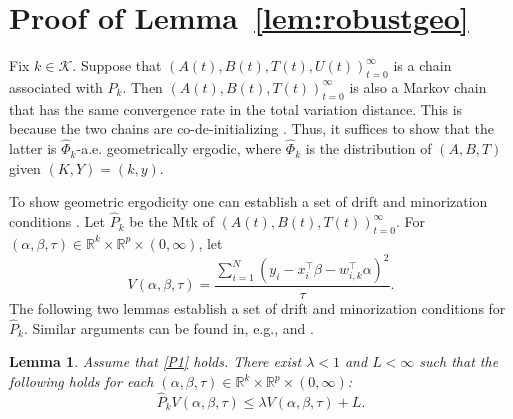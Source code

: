 \documentclass[12pt]{article}
\newtheorem{lemma}[theorem]{Lemma}
\begin{document}


\section{Proof of Lemma~\ref{lem:robustgeo}} \label{app:robustgeo}

Fix $k \in \mathcal{K}$.
Suppose that $(A(t), B(t), T(t), U(t))_{t=0}^{\infty}$ is a chain associated with $P_k$.
Then $(A(t), B(t), T(t))_{t=0}^{\infty}$ is also a Markov chain that has the same convergence rate in the total variation distance.
This is because the two chains are co-de-initializing \citep{roberts2001markov}.
Thus, it suffices to show that the latter is $\hat{\Phi}_k$-a.e. geometrically ergodic, where $\hat{\Phi}_k$ is the distribution of $(A,B,T)$ given $(K,Y) = (k,y)$.


To show geometric ergodicity one can establish a set of drift and minorization conditions \citep{rosenthal1995minorization}.
Let $\hat{P}_k$ be the Mtk of $(A(t), B(t), T(t))_{t=0}^{\infty}$.
For $(\alpha, \beta, \tau) \in \mathbb{R}^k \times \mathbb{R}^p \times (0,\infty)$, let
\[
V(\alpha, \beta, \tau) = \frac{\sum_{i=1}^N (y_i - x_i^{\top} \beta - w_{i,k}^{\top} \alpha)^2}{\tau}.
\]
The following two lemmas establish a set of drift and minorization conditions for $\hat{P}_k$.
Similar arguments can be found in, e.g., \cite{roy2010monte} and \cite{hobert2015convergence}.

\begin{lemma} \label{lem:robustdrift}
	Assume that \ref{P1} holds.
	There exist $\lambda < 1$ and $L < \infty$ such that the following holds for each $(\alpha, \beta, \tau) \in \mathbb{R}^k \times \mathbb{R}^p \times (0,\infty)$:
	\[
	\hat{P}_k V(\alpha, \beta, \tau) \leq \lambda V(\alpha, \beta, \tau) + L.
	\]
\end{lemma}
\end{document}
